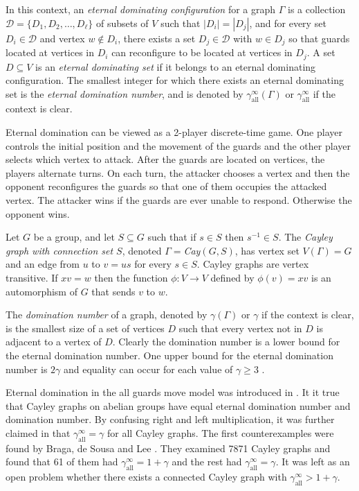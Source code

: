 \documentclass{amsart}
\theoremstyle{remark}
\theoremstyle{definition}
\newcommand{\etdom}{\gamma_{\mathrm{all}}^\infty}
\begin{document}
In this context, an \textit{eternal dominating configuration} for a graph $\Gamma$ is a collection $\mathcal{D} = \{D_1, D_2, \ldots, D_\ell\}$ of subsets of $V$ such that $|D_i| = |D_j|$, and for every set $D_i \in \mathcal{D}$ and vertex $w \not\in D_i$, there exists a set $D_j \in \mathcal{D}$ with $w \in D_j$ so that guards located at vertices in $D_i$ can reconfigure to be located at vertices in $D_j$.  
A set $D \subseteq V$ is an \textit{eternal dominating set} if it belongs to an eternal dominating configuration.  The smallest integer for which there exists an eternal dominating set is the \textit{eternal domination number}, and is denoted by $\etdom(\Gamma)$ or $\etdom$ if the context is clear.

Eternal domination can be viewed as a 2-player discrete-time game. One player controls the initial position and the movement of the guards and the other player selects which vertex to attack.  After the guards are located on vertices, the players alternate turns.  On each turn, the attacker chooses a vertex and then the opponent reconfigures the guards so that one of them occupies the attacked vertex.  The attacker wins if the guards are ever unable to respond.  Otherwise the opponent wins.

Let $G$ be a group, and
let $S \subseteq G$ such that  if $s \in S$ then $s^{-1} \in S$.
The \textit{Cayley graph with connection set $S$}, denoted $\Gamma = $\textit{Cay$(G, S)$}, has vertex set $V(\Gamma) = G$ and an edge from $u$ to $v = us$ for every $s \in S$.
Cayley graphs are vertex transitive.  If $xv = w$ then the function $\phi: V \to V$ defined by $\phi(v) = xv$ is an automorphism of $G$ that sends $v$ to $w$. 

The \textit{domination number} of a graph, denoted by $\gamma(\Gamma)$ or $\gamma$ if the context is clear, is the smallest size of a set of vertices $D$ such that every vertex not in $D$ is adjacent to a vertex of $D$.  Clearly the domination number is a lower bound for the eternal domination number.  One upper bound for the eternal domination number is $2\gamma$ and equality can occur for each value of $\gamma \geq 3$ \cite{KM16}.

Eternal domination in the all guards move model was introduced in \cite{GHH2005}.
It it true that Cayley graphs on abelian groups have equal eternal domination number and domination number.
By confusing right and left multiplication, it was further claimed in \cite{GHH2005} that $\etdom = \gamma$ for all Cayley graphs.
The first counterexamples were found by Braga, de Sousa and Lee \cite{BSL2016}.
They examined 7871 Cayley graphs and found that 61 of them had $\etdom = 1 + \gamma$ and the rest had $\etdom = \gamma$.  It was left as an open problem whether there exists a connected Cayley graph with $\etdom > 1 + \gamma$.
\end{document}
